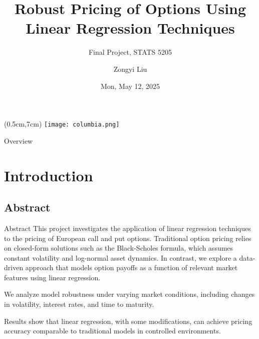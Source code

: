 \documentclass[aspectratio=169,xcolor=dvipsnames]{beamer}
\title{Robust Pricing of Options Using Linear Regression Techniques}
\subtitle{Final Project, STATS 5205}
\author{Zongyi Liu}
\date{Mon, May 12, 2025} %
\begin{document}
	
	\begin{frame}
		\titlepage
		
		\begin{textblock*}{3cm}(0.5cm,7cm) 
			\texttt{[image: columbia.png]}
		\end{textblock*}
	
	\end{frame}
	
	\begin{frame}{Overview}
	\tableofcontents
	\end{frame}
	
	\section{Introduction}
	
	\subsection{Abstract}
	\begin{frame}{Abstract}
	This project investigates the application of linear regression techniques to the pricing of European call and put options. Traditional option pricing relies on closed-form solutions such as the Black-Scholes formula, which assumes constant volatility and log-normal asset dynamics. In contrast, we explore a data-driven approach that models option payoffs as a function of relevant market features using linear regression. 
	
	We analyze model robustness under varying market conditions, including changes in volatility, interest rates, and time to maturity. 
	
	Results show that linear regression, with some modifications, can achieve pricing accuracy comparable to traditional models in controlled environments.

	\end{frame}
\end{document}
